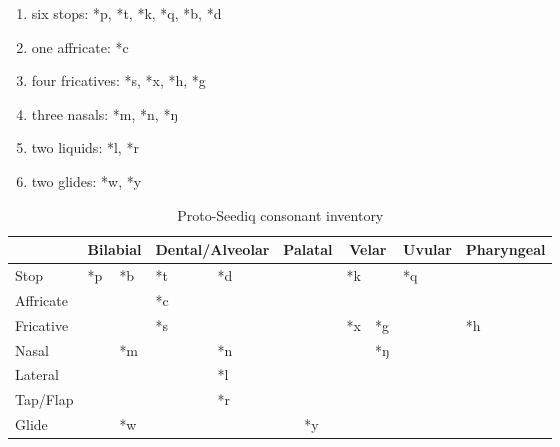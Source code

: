 \begin{enumerate}[label=(\roman*), itemsep=0pt, topsep=0pt]
    \item six stops: *p, *t, *k, *q, *b, *d
    \item one affricate: *c
    \item four fricatives: *s, *x, *h, *g
    \item three nasals: *m, *n, *ŋ
    \item two liquids: *l, *r
    \item two glides: *w, *y
\end{enumerate}

\begin{table}[!htbp]
\centering
\caption{Proto-Seediq consonant inventory}
\label{tab:psedC}
\begin{tabular}{l|ll|ll|ll|ll|ll|ll}
\hline
                    & \multicolumn{2}{c|}{Bilabial} & \multicolumn{2}{c|}{Dental/Alveolar} & \multicolumn{2}{c|}{Palatal} & \multicolumn{2}{c|}{Velar} & \multicolumn{2}{c|}{Uvular} & \multicolumn{2}{c}{Pharyngeal} \\ \hline
Stop                & *p            & *b           & *t  \quad\quad\quad             & *d               &             &               & *k          &           & *q            &            &                 &              \\
Affricate           &               &              & *c               &                  &             &               &             &             &               &            &                 &              \\
Fricative           &               &              & *s               &                  &             &               & *x          & *g         &               &            & *h              &              \\
Nasal               &               & *m           &                  & *n               &             &               &             & *ŋ          &               &            &                 &              \\
Lateral  &               &              &                  & *l               &             &               &             &             &               &            &                 &              \\
Tap/Flap                 &               &              &                  & *r               &             &               &             &             &               &            &                 &              \\
Glide               &               & *w           &                  &                  &             & *y            &             &             &               &            &                 &              \\ \hline
\end{tabular}
\end{table}

